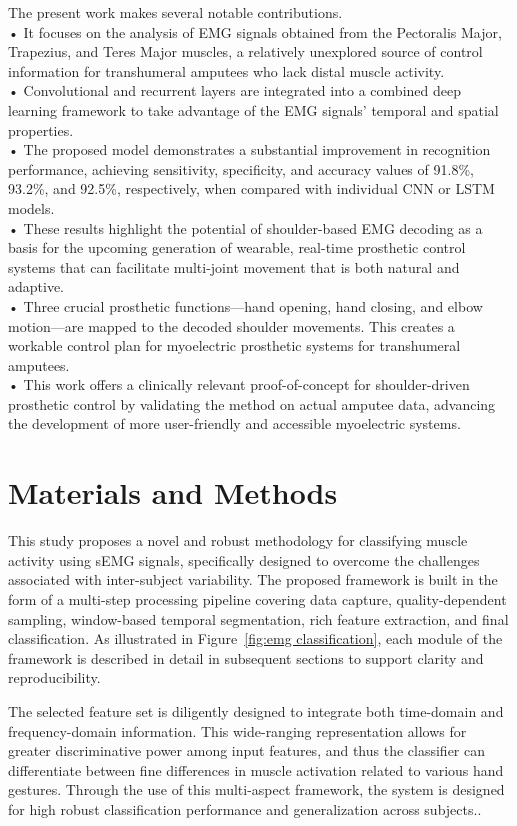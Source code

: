 \documentclass{elektr}
\begin{document}
The present work makes several notable contributions.\\
•	It focuses on the analysis of EMG signals obtained from the Pectoralis Major, Trapezius, and Teres Major muscles, a relatively unexplored source of control information for transhumeral amputees who lack distal muscle activity.\\
•	Convolutional and recurrent layers are integrated into a combined deep learning framework to take advantage of the EMG signals' temporal and spatial properties.\\
•	The proposed model demonstrates a substantial improvement in recognition performance, achieving sensitivity, specificity, and accuracy values of 91.8\%, 93.2\%, and 92.5\%, respectively, when compared with individual CNN or LSTM models.\\
•	These results highlight the potential of shoulder-based EMG decoding as a basis for the upcoming generation of wearable, real-time prosthetic control systems that can facilitate multi-joint movement that is both natural and adaptive.\\
•	Three crucial prosthetic functions—hand opening, hand closing, and elbow motion—are mapped to the decoded shoulder movements. This creates a workable control plan for myoelectric prosthetic systems for transhumeral amputees.\\
•	This work offers a clinically relevant proof-of-concept for shoulder-driven prosthetic control by validating the method on actual amputee data, advancing the development of more user-friendly and accessible myoelectric systems.
\section{Materials and Methods}
This study proposes a novel and robust methodology for classifying muscle activity using sEMG signals, specifically designed to overcome the challenges associated with inter-subject variability.  The proposed  framework is built in the form of a multi-step processing pipeline covering data capture, quality-dependent sampling, window-based temporal segmentation, rich feature extraction, and final classification. As illustrated in Figure~\ref{fig:emg classification}, each module of the framework is described in detail in subsequent sections to support clarity and reproducibility.

The selected feature set is diligently designed to integrate both time-domain and frequency-domain information. This wide-ranging representation allows for greater discriminative power among input features, and thus the classifier can differentiate between fine differences in muscle activation related to various hand gestures. Through the use of this multi-aspect framework, the system is designed for high robust classification performance and generalization across subjects..
\end{document}
